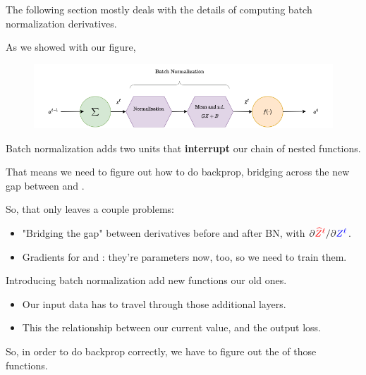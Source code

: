             \phantom{}

            \begin{remark*}
                The following section mostly deals with the details of computing batch normalization derivatives.
            \end{remark*}

            As we showed with our figure,

            \begin{figure}[H]
                \centering
                    \includegraphics[width=120mm,scale=0.5]{images/nn_2_images/batch_normalization.png}
            \end{figure}

            Batch normalization adds two units that \textbf{interrupt} our chain of nested functions.

            That means we need to figure out how to do backprop, bridging across the new gap between  and .


            So, that only leaves a couple problems:

            \begin{itemize}
                \item "Bridging the gap" between derivatives before and after BN, with ${\partial \textcolor{red}{\widehat{Z}^\ell}}/{\partial \textcolor{blue}{Z^\ell}}$.
                
                \item Gradients for  and : they're parameters now, too, so we need to train them.\\
                
            \end{itemize}

            \begin{concept}
                Introducing batch normalization add new functions  our old ones. 

                \begin{itemize}
                    \item Our input data has to travel through those additional layers.
                    \item This  the relationship between our current value, and the output loss.
                \end{itemize}

                So, in order to do backprop correctly, we have to figure out the  of those functions.
            \end{concept}


